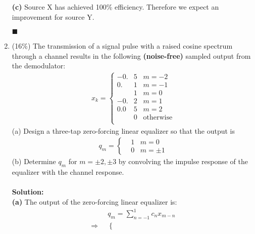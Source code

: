 \documentclass[a4paper,12pt]{article}
\begin{document}
\begin{enumerate}
            \textbf{(c)} Source X has achieved 100\% efficiency. Therefore we expect an improvement for source Y.
            \begin{flushright}
                $\blacksquare$
            \end{flushright}
        \item (16\%)
            The transmission of a signal pulse with a raised cosine spectrum through a channel results in the following \textbf{(noise-free)} sampled output from the demodulator: 
            \begin{align*}
                x_k = \left\{
                \begin{aligned}
                    -0.&5 \;\;\; m = -2 \\ 
                     0.&1 \;\;\; m = -1 \\ 
                       &1 \;\;\; m = 0 \\ 
                    -0.&2 \;\;\; m = 1 \\ 
                    0.0&5 \;\;\; m = 2 \\ 
                       &0 \;\;\; \text{otherwise} \\ 
                \end{aligned}
                \right.
            \end{align*}
            (a) Design a three-tap zero-forcing linear equalizer so that the output is 
            \begin{align*}
                q_m = \left\{
                \begin{aligned}
                    & 1 \;\;\; m = 0 \\ 
                    & 0 \;\;\; m = \pm 1 
                \end{aligned}
                \right.
            \end{align*}
            (b) Determine $q_m$ for $m = \pm 2, \pm 3$ by convolving the impulse response of the equalizer with the channel response. \\ \\ 
            \textbf{Solution:} \\
            \textbf{(a)} The output of the zero-forcing linear equalizer is:
            \begin{align*}
                & q_m = \sum_{n = -1}^{1} c_n x_{m - n} \\ 
                \Rightarrow \;\; & \left\{
                \begin{aligned}

\end{aligned}
\end{align*}
\end{enumerate}
\end{document}
